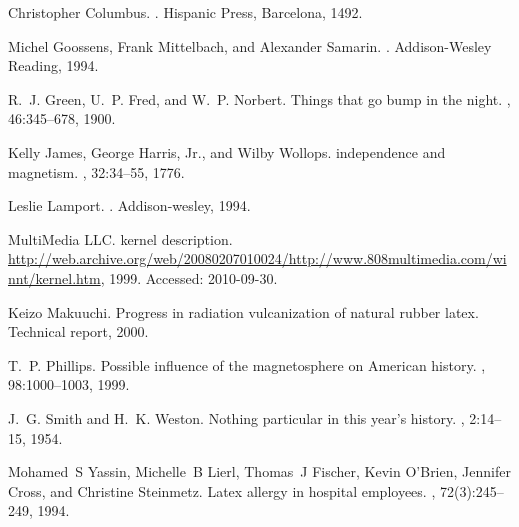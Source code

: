 \documentclass[12pt]{mines-thesis}
\begin{document}
% 
%
\begin{thebibliography}{10}
	
	Christopher Columbus.
	.
	\newblock Hispanic Press, Barcelona, 1492.
	
	Michel Goossens, Frank Mittelbach, and Alexander Samarin.
	.
	\newblock Addison-Wesley Reading, 1994.
	
	R.~J. Green, U.~P. Fred, and W.~P. Norbert.
	\newblock Things that go bump in the night.
	, 46:345--678, 1900.
	
	Kelly James, George Harris, Jr., and Wilby Wollops.
	 independence and magnetism.
	, 32:34--55, 1776.
	
	Leslie Lamport.
	.
	\newblock Addison-wesley, 1994.
	
	MultiMedia LLC.
	 kernel description.
	\newblock
	\url{http://web.archive.org/web/20080207010024/http://www.808multimedia.com/winnt/kernel.htm},
	1999.
	\newblock Accessed: 2010-09-30.
	
	Keizo Makuuchi.
	\newblock Progress in radiation vulcanization of natural rubber latex.
	\newblock Technical report, 2000.
	
	T.~P. Phillips.
	\newblock Possible influence of the magnetosphere on {American} history.
	, 98:1000--1003, 1999.
	
	J.~G. Smith and H.~K. Weston.
	\newblock Nothing particular in this year's history.
	, 2:14--15, 1954.
	
	Mohamed~S Yassin, Michelle~B Lierl, Thomas~J Fischer, Kevin O'Brien, Jennifer
	Cross, and Christine Steinmetz.
	\newblock Latex allergy in hospital employees.
	, 72(3):245--249, 1994.
	
\end{thebibliography}


\appendix 


\end{document}
